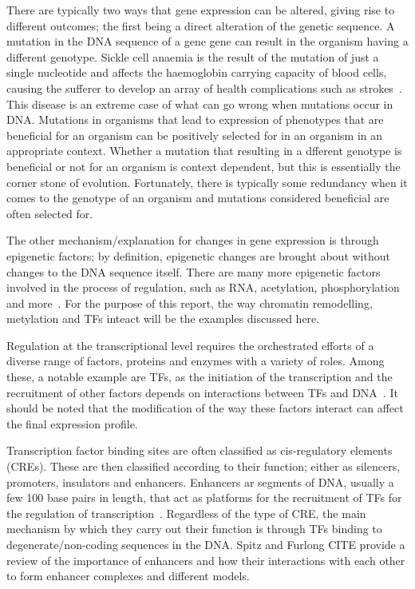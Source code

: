         There are typically two ways that gene expression can be altered, giving rise to different outcomes; the first being a direct alteration of the genetic sequence. A mutation in the DNA sequence of a gene gene can result in the organism having a different genotype.        %
        Sickle cell anaemia is the result of the mutation of just a single nucleotide and affects the haemoglobin carrying capacity of blood cells, causing the sufferer to develop an array of health complications such as strokes~\cite{clancy2008dna}. This disease is an extreme case of what can go wrong when mutations occur in DNA. Mutations in organisms that lead to expression of phenotypes that are beneficial for an organism can be positively selected for in an organism in an appropriate context. Whether a mutation that resulting in a dfferent genotype is beneficial or not for an organism is context dependent, but this is essentially the corner stone of evolution. Fortunately, there is typically some redundancy when it comes to the genotype of an organism and mutations considered beneficial are often selected for.
        
        The other mechanism/explanation for changes in gene expression is through epigenetic factors; by definition, epigenetic changes are brought about without changes to the DNA sequence itself. There are many more epigenetic factors involved in the process of regulation, such as RNA, acetylation, phosphorylation and more~\cite{geiman2002chromatin, jaenisch2003epigenetic,holoch2015rna, waterland2003transposable}. For the purpose of this report, the way chromatin remodelling, metylation and TFs inteact will be the examples discussed here.


        Regulation at the transcriptional level requires the orchestrated efforts of a diverse range of factors, proteins and enzymes with a variety of roles. Among these, a notable example are TFs, as the initiation of the transcription and the recruitment of other factors depends on interactions between TFs and DNA~\cite{lemon2000orchestrated}. It should be noted that the modification of the way these factors interact can affect the final expression profile. 
        
        Transcription factor binding sites are often classified as cis-regulatory elements (CREs). These are then classified according to their function; either as silencers, promoters, insulators and enhancers. Enhancers ar segments of DNA, usually a few 100 base pairs in length, that act as platforms for the recruitment of TFs for the regulation of transcription~\cite{spitz2012transcription}. Regardless of the type of CRE, the main mechanism by which they carry out their function is through TFs binding to degenerate/non-coding sequences in the DNA. Spitz and Furlong CITE provide a review of the importance of enhancers and how their interactions with each other to form enhancer complexes and different models. 
        
